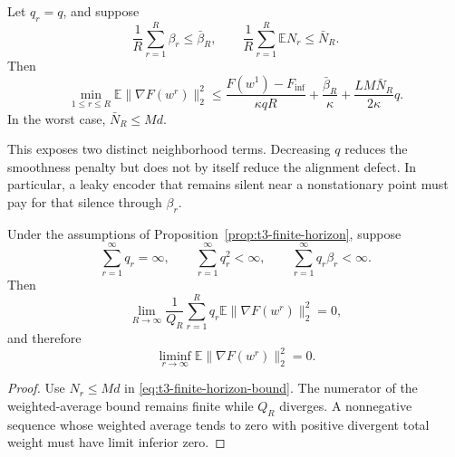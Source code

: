 \begin{corollary}
\label{cor:t3-constant-quantum}
Let $q_r=q$, and suppose
\begin{equation}
    \frac{1}{R}\sum_{r=1}^{R}\beta_r\leq\bar\beta_R,
    \qquad
    \frac{1}{R}\sum_{r=1}^{R}\mathbb{E}N_r\leq\bar N_R.
\end{equation}
Then
\begin{equation}
    \min_{1\leq r\leq R}
    \mathbb{E}\|\nabla F(w^r)\|_2^2
    \leq
    \frac{F(w^1)-F_{\inf}}{\kappa qR}
    +\frac{\bar\beta_R}{\kappa}
    +\frac{LM\bar N_R}{2\kappa}q.
    \label{eq:t3-constant-quantum-bound}
\end{equation}
In the worst case, $\bar N_R\leq Md$.
\end{corollary}

This exposes two distinct neighborhood terms.  Decreasing $q$ reduces the
smoothness penalty but does not by itself reduce the alignment defect.  In
particular, a leaky encoder that remains silent near a nonstationary point must
pay for that silence through $\beta_r$.

\begin{corollary}
\label{cor:t3-diminishing-quantum}
Under the assumptions of Proposition~\ref{prop:t3-finite-horizon}, suppose
\begin{equation}
    \sum_{r=1}^{\infty}q_r=\infty,
    \qquad
    \sum_{r=1}^{\infty}q_r^2<\infty,
    \qquad
    \sum_{r=1}^{\infty}q_r\beta_r<\infty.
    \label{eq:t3-robbins-monro-window}
\end{equation}
Then
\begin{equation}
    \lim_{R\to\infty}
    \frac{1}{Q_R}
    \sum_{r=1}^{R}q_r
    \mathbb{E}\|\nabla F(w^r)\|_2^2
    =0,
    \label{eq:t3-weighted-stationarity}
\end{equation}
and therefore
\begin{equation}
    \liminf_{r\to\infty}
    \mathbb{E}\|\nabla F(w^r)\|_2^2=0.
    \label{eq:t3-liminf-stationarity}
\end{equation}
\end{corollary}

\begin{proof}
Use $N_r\leq Md$ in \eqref{eq:t3-finite-horizon-bound}.  The numerator of the
weighted-average bound remains finite while $Q_R$ diverges.  A nonnegative
sequence whose weighted average tends to zero with positive divergent total
weight must have limit inferior zero.
\end{proof}

